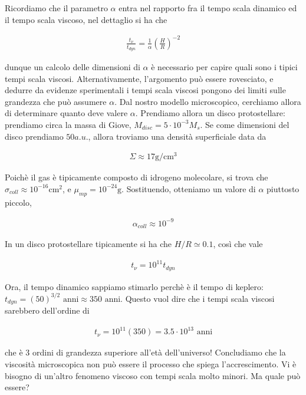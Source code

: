 \documentclass{report}
\begin{document}
Ricordiamo che il parametro \(\alpha\) entra nel rapporto fra il tempo scala dinamico ed il tempo scala viscoso, nel dettaglio si ha che 

\begin{align}
    \frac{t_\nu}{t_{dyn}} = \frac{1}{\alpha}\left(\frac{H}{R} \right)^{-2}
\end{align}

dunque un calcolo delle dimensioni di \(\alpha\) è necessario per capire quali sono i tipici tempi scala viscosi. Alternativamente, l'argomento può essere rovesciato, e dedurre da evidenze sperimentali i tempi scala viscosi pongono dei limiti sulle grandezza che può assumere \(\alpha\). Dal nostro modello microscopico, cerchiamo allora di determinare quanto deve valere \(\alpha\). Prendiamo allora un disco protostellare: prendiamo circa la massa di Giove, \(M_{disc} = 5 \cdot 10^{-3} M_{s}\). Se come dimensioni del disco prendiamo \(50 a.u.\), allora troviamo una densità superficiale data da 

\begin{align}
    \Sigma \approx  17 \text{g}/\text{cm}^3
\end{align}

Poichè il gas è tipicamente composto di idrogeno molecolare, si trova che \(\sigma_{coll} \approx 10^{-16} \text{cm}^2\), e \(\mu_{mp} = 10^{-24} \text{g}\). Sostituendo, otteniamo un valore di \(\alpha\) piuttosto piccolo, 

\begin{align}
    \alpha_{coll} \approx 10^{-9}
\end{align}

In un disco protostellare tipicamente si ha che \(H/R \simeq 0.1\), così che vale 

\begin{align}
    t_\nu = 10^{11}t_{dyn}
\end{align}

Ora, il tempo dinamico sappiamo stimarlo perchè è il tempo di keplero: \(t_{dyn} = (50)^{3/2} \text{ anni} \approx 350 \text{ anni}\). Questo vuol dire che i tempi scala viscosi sarebbero dell'ordine di 

\begin{align}
    t_\nu = 10^{11}(350) = 3.5 \cdot 10^{13} \text{ anni}
\end{align}

che è 3 ordini di grandezza superiore all'età dell'universo! Concludiamo che la viscosità microscopica non può essere il processo che spiega l'accrescimento. Vi è bisogno di un'altro fenomeno viscoso con tempi scala molto minori. Ma quale può essere? 
\end{document}
